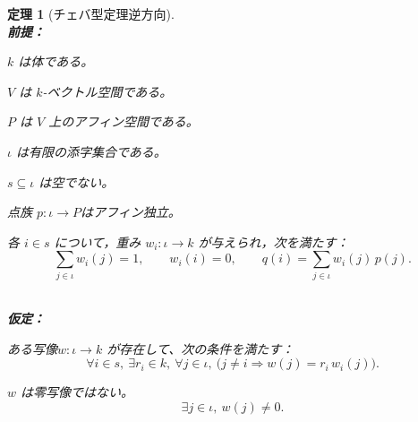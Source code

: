 \documentclass[a4paper,12pt]{bxjsbook}
\theoremstyle{theorem}
\newtheorem{theorem}{定理}[chapter]
\begin{document}
    \begin{theorem}[チェバ型定理逆方向]
        \noindent\textbf{\\前提：}\par
        \begin{theoremenumerate}[label=(P\arabic*), leftmargin=4em, topsep=2pt, partopsep=0pt, itemsep=0pt, parsep=0pt]
            \item $k$ は体である。
            \item $V$ は $k$-ベクトル空間である。
            \item $P$ は $V$ 上のアフィン空間である。
            \item $\iota$ は有限の添字集合である。
            \item $s \subseteq \iota$ は空でない。
            \item 点族 $p:\iota\to P$はアフィン独立。
            \item 各 $i\in s$ について，重み $w_i:\iota\to k$ が与えられ，次を満たす：
            \[
            \sum_{j\in\iota} w_i(j)=1,\qquad w_i(i)=0,\qquad q(i)=\sum_{j\in\iota} w_i(j)\,p(j).
            \]
        \end{theoremenumerate}
    
        \noindent\textbf{\\仮定：}\par
        \begin{theoremenumerate}[label=(A\arabic*), leftmargin=4em, topsep=2pt, partopsep=0pt, itemsep=0pt, parsep=0pt]
            \item ある写像$w:\iota\to k$ が存在して、次の条件を満たす：
            \[
            \forall i\in s,\ \exists r_i\in k,\ \forall j\in\iota,\ \bigl(j\neq i \Rightarrow w(j)=r_i\,w_i(j)\bigr).
            \]
            \item $w$ は零写像ではない。
            \[
            \exists j\in\iota,\ w(j)\neq 0.
            \]
        \end{theoremenumerate}
  

\end{theorem}
\end{document}
